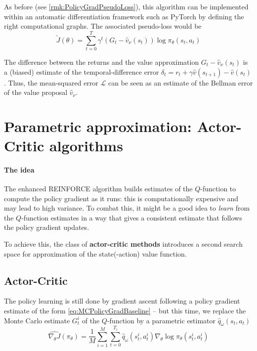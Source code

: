 \documentclass[12pt]{report}
\newcommand{\calL}{\mathcal{L}}
\newcommand{\bluefont}{\color{Blue}}
\begin{document}
As before (see \cref{rmk:PolicyGradPseudoLoss}), this algorithm can be implemented within an automatic differentiation framework such as \textsf{PyTorch} by defining the right computational graphs. The associated pseudo-loss would be
\[
	\tilde{J}(\theta) = 
	\sum_{t=0}^T \gamma^t (G_t - \widehat{v}_\nu(s_t)) \log\pi_\theta(s_t, a_t)
\]

\begin{remark}
The difference between the returns and the value approximation $G_t - \widehat{v}_\nu(s_t)$ is a (biased) estimate of the temporal-difference error $\delta_t = r_t + \gamma \widehat{v}(s_{t+1}) - \widehat{v}(s_t)$. Thus, the mean-squared error $\calL$ can be seen as an estimate of the Bellman error of the value proposal $\widehat{v}_\nu$.
\end{remark}



\section{Parametric approximation: Actor-Critic algorithms}


\paragraph{The idea} The enhanced REINFORCE algorithm builds estimates of the $Q$-function to compute the policy gradient as it runs: this is computationally expensive and may lead to high variance. To combat this, it might be a good idea to \textit{learn} from the $Q$-function estimates in a way that gives a consistent estimate that follows the policy gradient updates.

To achieve this, the class of \textbf{\bluefont actor-critic methods} introduces a second search space for approximation of the state(-action) value function.


\subsection{Actor-Critic}


The policy learning is still done by gradient ascent following a policy gradient estimate of the form \cref{eq:MCPolicyGradBaseline} -- but this time, we replace the Monte Carlo estimate $G^i_t$ of the $Q$-function by a parametric estimator $\widehat{q}_\omega(s_t, a_t)$
\begin{equation}\label{eq:ActorPolicyGrad}
	\widehat{\nabla_\theta J}(\pi_\theta) =
	\frac{1}{M}\sum_{i=1}^M
	\sum_{t=0}^{T_i} \widehat{q}_\omega(s^i_t,a^i_t)
	\nabla_\theta \log\pi_\theta(s^i_t, a^i_t)
\end{equation}
\end{document}
